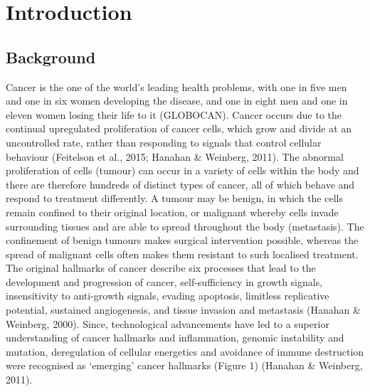 \documentclass[a4paper, twoside]{templates/ociamthesis}
\begin{document}
\flushbottom

\hypertarget{introduction}{%
\chapter*{Introduction}\label{introduction}}

\adjustmtc

\hypertarget{background}{%
\section{Background}\label{background}}

Cancer is the one of the world's leading health problems, with one in five men and one in six women developing the disease, and one in eight men and one in eleven women losing their life to it (GLOBOCAN). Cancer occurs due to the continual upregulated proliferation of cancer cells, which grow and divide at an uncontrolled rate, rather than responding to signals that control cellular behaviour (Feitelson et al., 2015; Hanahan \& Weinberg, 2011). The abnormal proliferation of cells (tumour) can occur in a variety of cells within the body and there are therefore hundreds of distinct types of cancer, all of which behave and respond to treatment differently. A tumour may be benign, in which the cells remain confined to their original location, or malignant whereby cells invade surrounding tissues and are able to spread throughout the body (metastasis). The confinement of benign tumours makes surgical intervention possible, whereas the spread of malignant cells often makes them resistant to such localised treatment.
The original hallmarks of cancer describe six processes that lead to the development and progression of cancer, self-sufficiency in growth signals, insensitivity to anti-growth signals, evading apoptosis, limitless replicative potential, sustained angiogenesis, and tissue invasion and metastasis (Hanahan \& Weinberg, 2000). Since, technological advancements have led to a superior understanding of cancer hallmarks and inflammation, genomic instability and mutation, deregulation of cellular energetics and avoidance of immune destruction were recognised as `emerging' cancer hallmarks (Figure 1) (Hanahan \& Weinberg, 2011).
\end{document}
